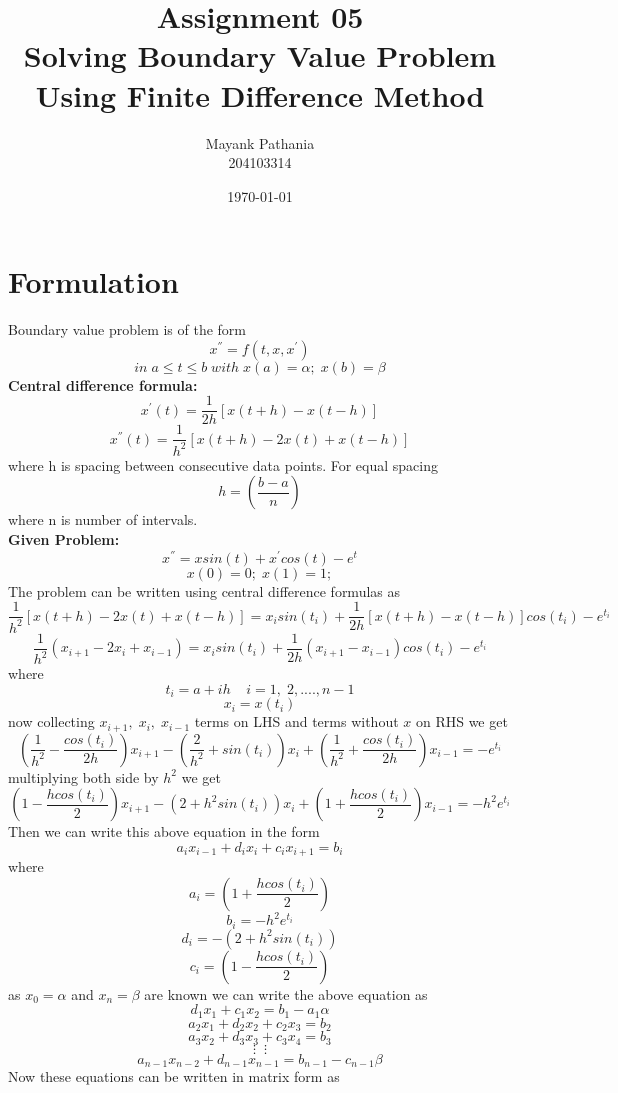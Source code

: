 \documentclass[12pt]{article}
\title{
	\textbf{Assignment 05\\}
		Solving Boundary Value Problem\\
		Using Finite Difference Method
}
\author{Mayank Pathania\\204103314}
\date{\today}
\begin{document}
	\maketitle
	
	\section{Formulation}
    Boundary value problem is of the form
	\[x^{''} = f(t,x,x^{'}) \]
    \[in\;a\leq t \leq b \; with \; x(a)=\alpha;\; x(b)=\beta\]
	\textbf{Central difference formula:}
    \[x^{'}(t)=\frac{1}{2h}[x(t+h) - x(t - h)]\]
    \[x^{''}(t)=\frac{1}{h^2}[x(t+h)-2x(t)+x(t-h)]\]
    where h is spacing between consecutive data points. For equal spacing \[h = (\frac{b -a}{n})\] where n is number of intervals.\\
    \textbf{Given Problem:}
    \[x^{''} = xsin(t) + x^{'}cos(t)-e^{t}\]
    \[x(0) = 0;\; x(1) = 1;\]
    The problem can be written using central difference formulas as
    \[\frac{1}{h^2}[x(t + h) - 2x(t) + x(t - h)] = x_isin(t_i) + \frac{1}{2h}[x(t + h) - x(t - h)]cos(t_i) - e^{t_i}\]
    \[\frac{1}{h^2}(x_{i+1}-2x_i+x_{i-1}) = x_isin(t_i) + \frac{1}{2h}(x_{i+1} - x_{i-1})cos(t_i) - e^{t_i}\]
    where \[t_i = a + ih\;\;\;\;i = 1,\;2,....,n-1\] \[x_{i}=x(t_i)\]
    now collecting $x_{i+1},\;x_i,\;x_{i-1}$ terms on LHS and terms without $x$ on RHS we get
    \[(\frac{1}{h^2} - \frac{cos(t_i)}{2h})x_{i+1} -(\frac{2}{h^2} + sin(t_i))x_i + (\frac{1}{h^2} + \frac{cos(t_i)}{2h})x_{i-1} = -e^{t_i}\]
    multiplying both side by $h^2$ we get
    \[(1 - \frac{hcos(t_i)}{2})x_{i+1} -(2 + h^{2}sin(t_i))x_i + (1 + \frac{hcos(t_i)}{2})x_{i-1} = -h^{2}e^{t_i}\]
    Then we can write this above equation in the form 
    \[a_ix_{i-1} + d_ix_{i} + c_ix_{i + 1} = b_i\]
    where \[a_i = (1 + \frac{hcos(t_i)}{2})\]
        \[b_i = -h^{2}e^{t_i}\]
        \[d_i = -(2 + h^{2}sin(t_i))\]
        \[c_i = (1 - \frac{hcos(t_i)}{2})\]
    as $x_0 = \alpha$ and $x_n = \beta$ are known we can write the above equation as
    \[d_1x_{1} + c_1x_{2} = b_1 - a_1\alpha\]
    \[a_2x_{1} + d_2x_{2} + c_2x_{3} = b_2\]
    \[a_3x_{2} + d_3x_{3} + c_3x_{4} = b_3\]
    \[\vdots\;\;\vdots\]
    \[a_{n - 1}x_{n - 2} + d_{n - 1}x_{n - 1} = b_{n - 1} - c_{n - 1}\beta\]
    Now these equations can be written in matrix form as
\end{document}
